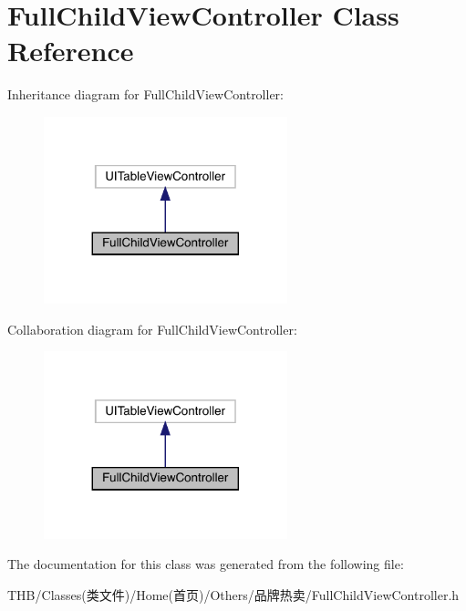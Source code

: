 \hypertarget{interface_full_child_view_controller}{}\section{Full\+Child\+View\+Controller Class Reference}
\label{interface_full_child_view_controller}


Inheritance diagram for Full\+Child\+View\+Controller\+:\nopagebreak
\begin{figure}[H]
\begin{center}
\leavevmode
\includegraphics[width=200pt]{interface_full_child_view_controller__inherit__graph}
\end{center}
\end{figure}


Collaboration diagram for Full\+Child\+View\+Controller\+:\nopagebreak
\begin{figure}[H]
\begin{center}
\leavevmode
\includegraphics[width=200pt]{interface_full_child_view_controller__coll__graph}
\end{center}
\end{figure}


The documentation for this class was generated from the following file\+:\begin{DoxyCompactItemize}
\item 
T\+H\+B/\+Classes(类文件)/\+Home(首页)/\+Others/品牌热卖/Full\+Child\+View\+Controller.\+h\end{DoxyCompactItemize}
